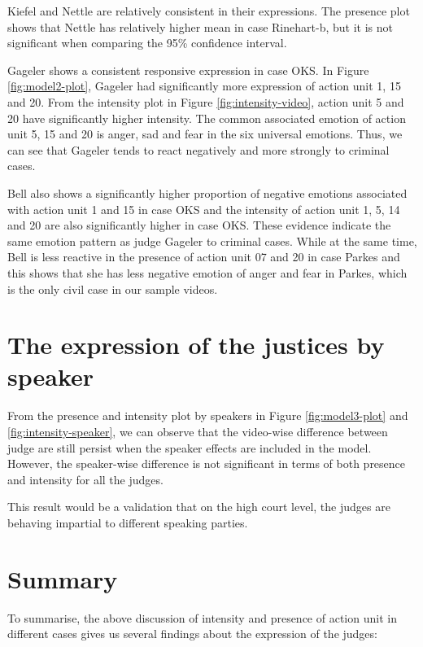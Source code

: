 \documentclass{monashthesis}
\begin{document}
Kiefel and Nettle are relatively consistent in their expressions. The presence plot shows that Nettle has relatively higher mean in case Rinehart-b, but it is not significant when comparing the 95\% confidence interval.

Gageler shows a consistent responsive expression in case OKS. In Figure \ref{fig:model2-plot}, Gageler had significantly more expression of action unit 1, 15 and 20. From the intensity plot in Figure \ref{fig:intensity-video}, action unit 5 and 20 have significantly higher intensity. The common associated emotion of action unit 5, 15 and 20 is anger, sad and fear in the six universal emotions. Thus, we can see that Gageler tends to react negatively and more strongly to criminal cases.

Bell also shows a significantly higher proportion of negative emotions associated with action unit 1 and 15 in case OKS and the intensity of action unit 1, 5, 14 and 20 are also significantly higher in case OKS. These evidence indicate the same emotion pattern as judge Gageler to criminal cases. While at the same time, Bell is less reactive in the presence of action unit 07 and 20 in case Parkes and this shows that she has less negative emotion of anger and fear in Parkes, which is the only civil case in our sample videos.

\hypertarget{the-expression-of-the-justices-by-speaker}{%
\section{The expression of the justices by speaker}\label{the-expression-of-the-justices-by-speaker}}

From the presence and intensity plot by speakers in Figure \ref{fig:model3-plot} and \ref{fig:intensity-speaker}, we can observe that the video-wise difference between judge are still persist when the speaker effects are included in the model. However, the speaker-wise difference is not significant in terms of both presence and intensity for all the judges.

This result would be a validation that on the high court level, the judges are behaving impartial to different speaking parties.

\hypertarget{summary}{%
\section{Summary}\label{summary}}

To summarise, the above discussion of intensity and presence of action unit in different cases gives us several findings about the expression of the judges:
\end{document}

